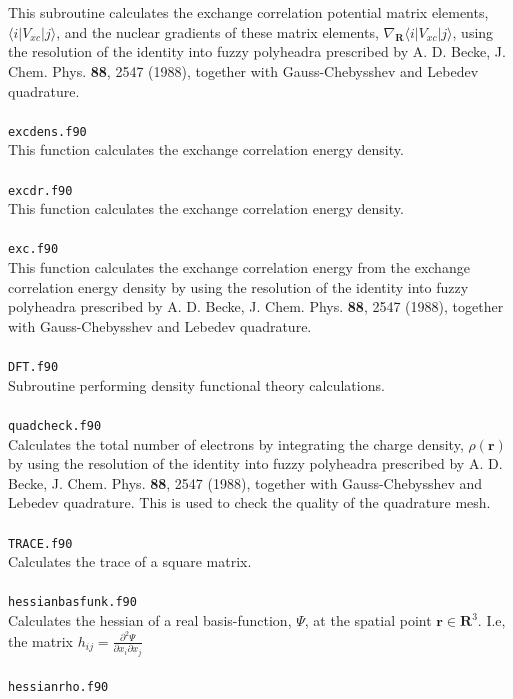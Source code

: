 \documentclass[a4paper,twoside,openany]{book}
\begin{document}
{{This subroutine calculates the exchange correlation potential 
matrix elements, $\langle i|V_{xc}|j \rangle$, and the nuclear gradients of these matrix
elements, $\nabla_{\mathbf{R}}\langle i|V_{xc}|j \rangle$, using the resolution of the identity into fuzzy
polyheadra prescribed by A. D. Becke, J. Chem. Phys. {\bf 88}, 2547 (1988),
together with Gauss-Chebysshev and Lebedev quadrature. \\ \\
\texttt{excdens.f90}\\
This function calculates the exchange correlation energy density.\\ \\
\texttt{excdr.f90}\\
This function calculates the exchange correlation energy density.\\ \\
\texttt{exc.f90}\\
This function calculates the exchange correlation energy from the exchange correlation energy density by using the resolution of the identity into fuzzy
polyheadra prescribed by A. D. Becke, J. Chem. Phys. {\bf 88}, 2547 (1988), together with Gauss-Chebysshev and Lebedev quadrature. \\ \\
\texttt{DFT.f90}\\
Subroutine performing density functional theory calculations. \\ \\
\texttt{quadcheck.f90}\\
Calculates the total number of electrons by integrating the charge density, $\rho(\mathbf{r})$  by using the resolution of the identity into fuzzy
polyheadra prescribed by A. D. Becke, J. Chem. Phys. {\bf 88}, 2547 (1988), together with Gauss-Chebysshev and Lebedev quadrature. This is used to 
check the quality of the quadrature mesh. \\ \\   
\texttt{TRACE.f90}\\
Calculates the trace of a square matrix. \\ \\
\texttt{hessianbasfunk.f90} \\
Calculates the hessian of a real basis-function, $\Psi$, at the spatial
point $\mathbf{r}\in\mathbf{R}^{3}$. I.e, the matrix $h_{ij} = \frac{\partial^2 \Psi}{\partial x_{i}\partial x_{j}}$ \\ \\
\texttt{hessianrho.f90}\\
}}
\end{document}
